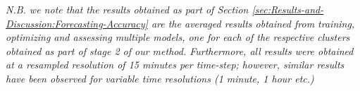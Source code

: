 \noindent \newline \textit{N.B. we note that the results obtained as part of Section \ref{sec:Results-and-Discussion:Forecasting-Accuracy} are the averaged results obtained from training, optimizing and assessing multiple models, one for each of the respective clusters obtained as part of stage 2 of our method. Furthermore, all results were obtained at a resampled resolution of 15 minutes per time-step; however, similar results have been observed for variable time resolutions (1 minute, 1 hour etc.)}